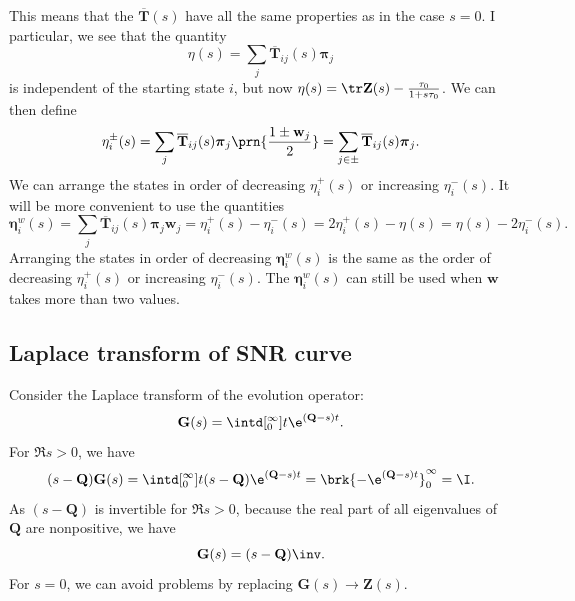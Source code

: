 \documentclass[12pt]{article}
\newcommand{\MM}{\mathbf{Q}}
\newcommand{\eq}{\pib}
\newcommand{\fpt}{\mathbf{T}}
\newcommand{\fptb}{\overline{\fpt}}
\newcommand{\fund}{\mathbf{Z}}
\newcommand{\pib}{\boldsymbol{\pi}}
\newcommand{\etw}{\boldsymbol{\eta}^w}
\newcommand{\w}{\mathbf{w}}
\begin{document}
This means that the \( \fptb(s) \) have all the same properties as in the case $s=0$.
I particular, we see that the quantity
%
\begin{equation}\label{eq:lkemeny}
  \eta(s) = \sum_j \fptb_{ij}(s)\eq_j
\end{equation}
%
is independent of the starting state $i$, but now $\eta(s) = \tr\fund(s) - \frac{\tau_0}{1 + s \tau_0}$.
We can then define
%
\begin{equation}\label{eq:lpmixtime}
  \eta^{\pm}_i(s) = \sum_j \fptb_{ij}(s) \eq_j \prn{\frac{1 \pm \w_j}{2}} 
      =  \sum_{j\in \pm} \fptb_{ij}(s) \eq_j.
\end{equation}
%
We can arrange the states in order of decreasing $\eta^{+}_i(s)$ or increasing $\eta^{-}_i(s)$.
It will be more convenient to use the quantities
%
\begin{equation}\label{eq:lwpmixtime}
  \etw_i(s) = \sum_j \fptb_{ij}(s)\eq_j \w_j
    = \eta^+_i(s) - \eta^-_i(s) 
    = 2\eta^+_i(s) - \eta(s) 
    = \eta(s) - 2\eta^-_i(s) .
\end{equation}
%
Arranging the states in order of decreasing $\etw_i(s)$ is the same as the order of decreasing $\eta^{+}_i(s)$ or increasing $\eta^{-}_i(s)$.
The $\etw_i(s)$ can still be used when $\w$ takes more than two values.



\subsection{Laplace transform of SNR curve}\label{sec:laplaceSNR}

Consider the Laplace transform of the evolution operator:
%
\begin{equation}\label{eq:levol}
  \mathbf{G}(s) = \intd[_0^{\infty}]{t} \e^{(\MM-s) t}.
\end{equation}
%
For $\Re s>0$, we have
%
\begin{equation}\label{eq:levolcalc}
  (s-\MM)\mathbf{G}(s) = \intd[_0^{\infty}]{t} (s-\MM)\e^{(\MM-s) t} = \brk{-\e^{(\MM-s) t}}_0^{\infty} = \I.
\end{equation}
%
As $(s-\MM)$ is invertible for $\Re s>0$, because the real part of all eigenvalues of $\MM$ are nonpositive, we have
%
\begin{equation}\label{eq:levolres}
  \mathbf{G}(s) = (s-\MM)\inv.
\end{equation}
%
For $s=0$, we can avoid problems by replacing $\mathbf{G}(s) \to \fund(s)$.
\end{document}

